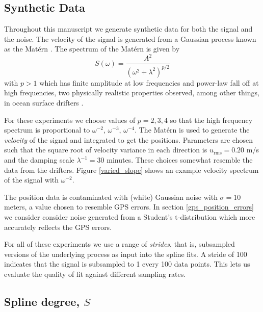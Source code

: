 \documentclass[10pt,journal]{IEEEtran}
\begin{document}
\subsection{Synthetic Data}
\label{sec:synthetic_data}

Throughout this manuscript we generate synthetic data for both the signal and the noise. The velocity of the signal is generated from a Gaussian process known as the Mat\'ern \cite{lilly2017-npg}. The spectrum of the Mat\'ern is given by
\begin{equation}
S(\omega) = \frac{A^2}{(\omega^2 + \lambda^2)^{p/2}}
\end{equation}
with $p>1$ which has finite amplitude at low frequencies and power-law fall off at high frequencies, two physically realistic properties observed, among other things, in ocean surface drifters \cite{sykulski2016-jrssc}.


For these experiments we choose values of $p=2,3,4$ so that the high frequency spectrum is proportional to $\omega^{-2}$, $\omega^{-3}$, $\omega^{-4}$. The Mat\'ern is used to generate the \emph{velocity} of the signal and integrated to get the positions. Parameters are chosen such that the square root of velocity variance in each direction is $u_{\textrm{rms}}=0.20$ m/s and the damping scale $\lambda^{-1}=30$ minutes. These choices somewhat resemble the data from the drifters. Figure \ref{varied_slope} shows an example velocity spectrum of the signal with $\omega^{-2}$.

The position data is contaminated with (white) Gaussian noise with $\sigma=10$ meters, a value chosen to resemble GPS errors. In section \ref{gps_position_errors} we consider consider noise generated from a Student's t-distribution which more accurately reflects the GPS errors.

For all of these experiments we use a range of \emph{strides}, that is, subsampled versions of the underlying process as input into the spline fits. A stride of 100 indicates that the signal is subsampled to 1 every 100 data points. This lets us evaluate the quality of fit against different sampling rates.

\subsection{Spline degree, $S$} \label{spline_degree}
\end{document}
